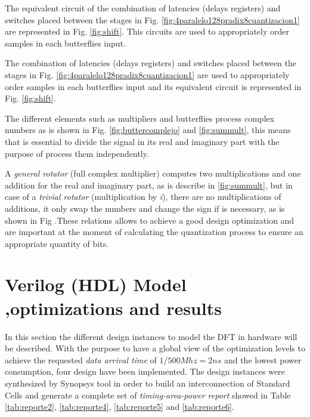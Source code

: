 \documentclass[journal,comsoc]{IEEEtran}
\begin{document}
The equivalent circuit of the combination of latencies (delays registers) and switches placed between the stages in Fig. \ref{fig:4paralelo128pradix8cuantizacion1} are represented in Fig. \ref{fig:shift}. This circuits are used to appropriately order samples in each butterflies input.

The combination of latencies (delays registers) and switches placed between the stages in Fig. \ref{fig:4paralelo128pradix8cuantizacion1} are used to appropriately order samples in each butterflies input and its equivalent circuit is represented in Fig. \ref{fig:shift}.

The different elements such as multipliers and butterflies process complex numbers as is shown in Fig. \ref{fig:buttercomplejo} and \ref{fig:summult}, this means that
is essential to divide the signal in its real and imaginary part with the purpose of process them independently.

A \textit{general rotator} (full complex multiplier) computes two multiplications and one addition for the real and imaginary part, as is describe in \ref{fig:summult}, but in case of a \textit{trivial rotator} (multiplication by  \textit{i}), there are no multiplications of additions, it only swap the numbers and change the sign if is necessary, as is shown in Fig .These relations allows to achieve a good design optimization and are important at the moment of calculating the quantization process to ensure an appropriate quantity of bits.



\section{Verilog (HDL) Model ,optimizations and results} 

In this section the different design instances to model the DFT in hardware will be described. With the purpose to have a global view of the optimization levels to achieve the requested \textit{data arrival time} of $1/500Mhz=2ns$ and the lowest power consumption, four design have been implemented. The design instances were synthesized by Synopsys tool in order to build an interconnection of Standard Cells and generate a complete set of \textit{timing-area-power report} showed in Table \ref{tab:reporte2}, \ref{tab:reporte4}, \ref{tab:reporte5} and  \ref{tab:reporte6}.
\end{document}
